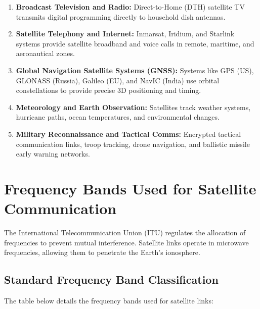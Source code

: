 \documentclass[12pt,a4paper]{article}
\begin{document}
\begin{enumerate}[label=\textbf{\arabic*.}, leftmargin=*, itemsep=4pt]
  \item \textbf{Broadcast Television and Radio:} Direct-to-Home (DTH) satellite TV transmits digital programming directly to household dish antennas.
  \item \textbf{Satellite Telephony and Internet:} Inmarsat, Iridium, and Starlink systems provide satellite broadband and voice calls in remote, maritime, and aeronautical zones.
  \item \textbf{Global Navigation Satellite Systems (GNSS):} Systems like GPS (US), GLONASS (Russia), Galileo (EU), and NavIC (India) use orbital constellations to provide precise 3D positioning and timing.
  \item \textbf{Meteorology and Earth Observation:} Satellites track weather systems, hurricane paths, ocean temperatures, and environmental changes.
  \item \textbf{Military Reconnaissance and Tactical Comms:} Encrypted tactical communication links, troop tracking, drone navigation, and ballistic missile early warning networks.
\end{enumerate}

\section{Frequency Bands Used for Satellite Communication}

The International Telecommunication Union (ITU) regulates the allocation of frequencies to prevent mutual interference. Satellite links operate in microwave frequencies, allowing them to penetrate the Earth's ionosphere.

\subsection{Standard Frequency Band Classification}
The table below details the frequency bands used for satellite links:
\end{document}
